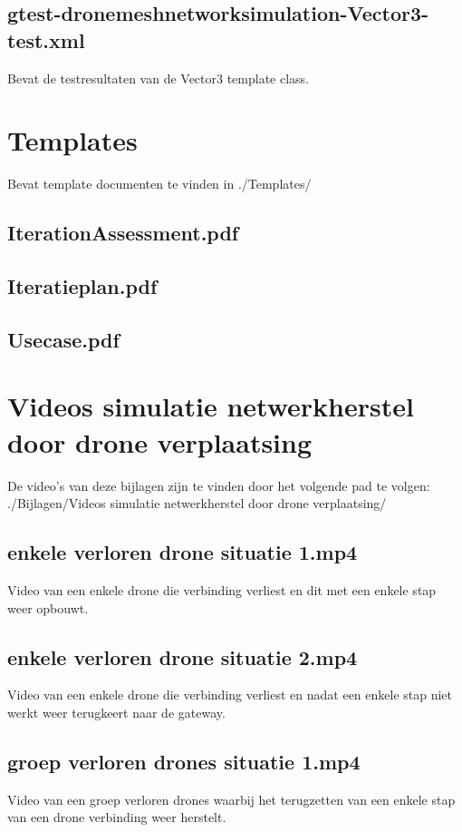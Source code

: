 \documentclass[a4paper, 11pt, oneside]{report}
\begin{document}
\section{gtest-drone\textunderscore meshnetwork\textunderscore simulation-Vector3-test.xml}\label{sec:gtest-dronemeshnetworksimulation-vector3-testxml}
Bevat de testresultaten van de Vector3 template class.

\chapter{Templates}\label{app:templates}
Bevat template documenten te vinden in ./Templates/
\section{IterationAssessment.pdf}\label{app:IterationAssessment}
\section{Iteratieplan.pdf}\label{app:Iteratieplan}
\section{Usecase.pdf}\label{app:Usecase}


\chapter{Videos simulatie netwerkherstel door drone verplaatsing}\label{sec:videos-simulatie-netwerkherstel-door-drone-verplaatsing}
De video's van deze bijlagen zijn te vinden door het volgende pad te volgen: \newline
./Bijlagen/Videos simulatie netwerkherstel door drone verplaatsing/
\section{enkele verloren drone situatie 1.mp4}\label{sec:enkele-verloren-drone-situatie-1mp4} Video van een enkele drone die verbinding verliest en dit met een enkele stap weer opbouwt.
\section{enkele verloren drone situatie 2.mp4}\label{sec:enkele-verloren-drone-situatie-2mp4} Video van een enkele drone die verbinding verliest en nadat een enkele stap niet werkt weer terugkeert naar de gateway.
\section{groep verloren drones situatie 1.mp4}\label{sec:groep-verloren-drones-situatie-1mp4} Video van een groep verloren drones waarbij het terugzetten van een enkele stap van een drone verbinding weer herstelt.
\end{document}
